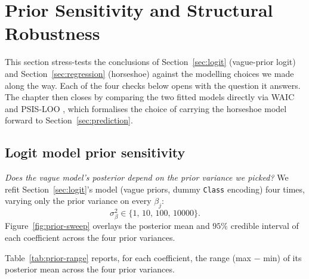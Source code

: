 \section{Prior Sensitivity and Structural Robustness}
\label{sec:sensitivity}
This section stress-tests the conclusions of Section~\ref{sec:logit}
(vague-prior logit) and Section~\ref{sec:regression} (horseshoe) against the
modelling choices we made along the way. Each of the four checks below opens
with the question it answers. The chapter then closes by comparing the two
fitted models directly via WAIC and PSIS-LOO \cite{bl_book}, which formalises
the choice of carrying the horseshoe model forward to
Section~\ref{sec:prediction}.

\subsection{Logit model prior sensitivity}
\label{sec:sens-logit}
\emph{Does the vague model's posterior depend on the prior variance we
picked?} We refit Section~\ref{sec:logit}'s model (vague priors, dummy \texttt{Class}
encoding) four times, varying only the prior variance on every
$\beta_j$:
\[
  \sigma^2_\beta \in \{1,\, 10,\, 100,\, 10000\}.
\]
Figure~\ref{fig:prior-sweep}
overlays the posterior mean and $95\%$ credible interval of each
coefficient across the four prior variances.

Table~\ref{tab:prior-range} reports, for each coefficient, the range
(max $-$ min) of its posterior mean across the four prior variances.

